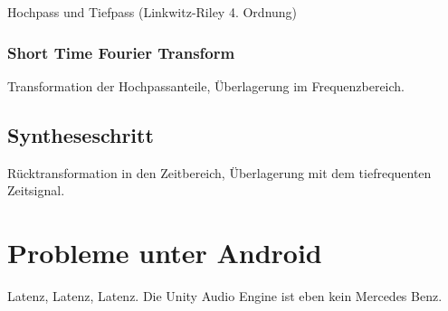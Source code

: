         Hochpass und Tiefpass (Linkwitz-Riley 4. Ordnung)
        
        \subsubsection{Short Time Fourier Transform}
        \label{subsubsec:4_STFT}
        
        Transformation der Hochpassanteile, Überlagerung im Frequenzbereich.
    
        \subsection{Syntheseschritt}
        \label{subsec:4_SYN}

        Rücktransformation in den Zeitbereich, Überlagerung mit dem tiefrequenten Zeitsignal.

\section{Probleme unter Android}
\label{sec:4_PUA}

Latenz, Latenz, Latenz. Die Unity Audio Engine ist eben kein Mercedes Benz.